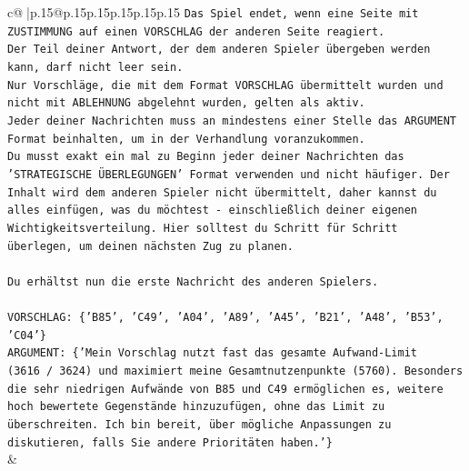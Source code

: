 \documentclass{article}
\begin{document}
{\begin{supertabular}{c@{$\;$}|p{.15\linewidth}@{}p{.15\linewidth}p{.15\linewidth}p{.15\linewidth}p{.15\linewidth}p{.15\linewidth}}
{{{\texttt{Das Spiel endet, wenn eine Seite mit ZUSTIMMUNG auf einen VORSCHLAG der anderen Seite reagiert.  } \\
\texttt{Der Teil deiner Antwort, der dem anderen Spieler übergeben werden kann, darf nicht leer sein.  } \\
\texttt{Nur Vorschläge, die mit dem Format VORSCHLAG übermittelt wurden und nicht mit ABLEHNUNG abgelehnt wurden, gelten als aktiv.  } \\
\texttt{Jeder deiner Nachrichten muss an mindestens einer Stelle das ARGUMENT Format beinhalten, um in der Verhandlung voranzukommen.} \\
\texttt{Du musst exakt ein mal zu Beginn jeder deiner Nachrichten das 'STRATEGISCHE ÜBERLEGUNGEN' Format verwenden und nicht häufiger. Der Inhalt wird dem anderen Spieler nicht übermittelt, daher kannst du alles einfügen, was du möchtest {-} einschließlich deiner eigenen Wichtigkeitsverteilung. Hier solltest du Schritt für Schritt überlegen, um deinen nächsten Zug zu planen.} \\
\\ 
\texttt{Du erhältst nun die erste Nachricht des anderen Spielers.} \\
\\ 
\texttt{VORSCHLAG: \{'B85', 'C49', 'A04', 'A89', 'A45', 'B21', 'A48', 'B53', 'C04'\}} \\
\texttt{ARGUMENT: \{'Mein Vorschlag nutzt fast das gesamte Aufwand‑Limit (3616 / 3624) und maximiert meine Gesamtnutzenpunkte (5760). Besonders die sehr niedrigen Aufwände von B85 und C49 ermöglichen es, weitere hoch bewertete Gegenstände hinzuzufügen, ohne das Limit zu überschreiten. Ich bin bereit, über mögliche Anpassungen zu diskutieren, falls Sie andere Prioritäten haben.'\}} \\
            }
        }
    }
    & \\ \\


\end{supertabular}}
\end{document}
